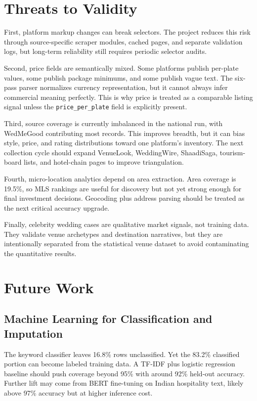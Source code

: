 \documentclass[conference]{IEEEtran}
\begin{document}
\section{Threats to Validity}

First, platform markup changes can break selectors. The project reduces this risk through source-specific scraper modules, cached pages, and separate validation logs, but long-term reliability still requires periodic selector audits.

Second, price fields are semantically mixed. Some platforms publish per-plate values, some publish package minimums, and some publish vague text. The six-pass parser normalizes currency representation, but it cannot always infer commercial meaning perfectly. This is why price is treated as a comparable listing signal unless the \texttt{price\_per\_plate} field is explicitly present.

Third, source coverage is currently imbalanced in the national run, with WedMeGood contributing most records. This improves breadth, but it can bias style, price, and rating distributions toward one platform's inventory. The next collection cycle should expand VenueLook, WeddingWire, ShaadiSaga, tourism-board lists, and hotel-chain pages to improve triangulation.

Fourth, micro-location analytics depend on area extraction. Area coverage is 19.5\%, so MLS rankings are useful for discovery but not yet strong enough for final investment decisions. Geocoding plus address parsing should be treated as the next critical accuracy upgrade.

Finally, celebrity wedding cases are qualitative market signals, not training data. They validate venue archetypes and destination narratives, but they are intentionally separated from the statistical venue dataset to avoid contaminating the quantitative results.

\section{Future Work}

\subsection{Machine Learning for Classification and Imputation}

The keyword classifier leaves 16.8\% rows unclassified. Yet the 83.2\% classified portion can become labeled training data. A TF-IDF plus logistic regression baseline should push coverage beyond 95\% with around 92\% held-out accuracy. Further lift may come from BERT fine-tuning on Indian hospitality text, likely above 97\% accuracy but at higher inference cost.
\end{document}
